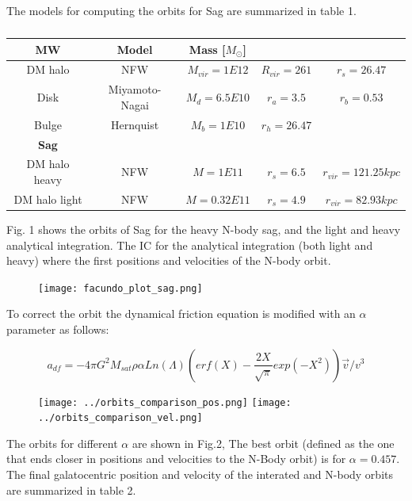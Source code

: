 \label{sec:intro}

The models for computing the orbits for Sag are summarized in table 1.

\begin{table}[H]
\begin{center}
\begin{tabular}{c c c c c}
\hline
\textbf{MW} & Model & Mass [$M_{\odot}$] &  & \\
\hline
DM halo & NFW & $M_{vir} = 1E12$ &$R_{vir} = 261$ &  $r_s = 26.47$ \\
Disk & Miyamoto-Nagai &  $M_d = 6.5E10$ & $r_a = 3.5$ &  $r_b=0.53$  \\
Bulge & Hernquist &  $M_b = 1E10$  & $r_{h} = 26.47 $ &   \\
\hline
\textbf{Sag} & & & &  \\
\hline
DM halo heavy& NFW & $M = 1E11 $ & $r_s=6.5$ & $r_{vir} = 121.25 kpc$ \\
DM halo light & NFW & $M=0.32E11 $ & $r_s = 4.9$ & $r_{vir} = 82.93 kpc$ \\
\hline
\end{tabular}
\end{center}
\caption{}
\end{table}

Fig. 1 shows the orbits of Sag for the heavy N-body sag, and the light 
and heavy analytical integration. The IC for the analytical integration
(both light and heavy) where the first positions and velocities of 
the N-body orbit.  

\begin{figure}[H]
\centering
\texttt{[image: facundo\_plot\_sag.png]}
\caption{}
\end{figure}


To correct the orbit the dynamical friction equation is modified 
with an $\alpha$ parameter as follows:

\begin{equation}
a_{df} = -4\pi G^2 M_{sat} \rho \alpha Ln(\Lambda)  \left( erf(X) - \dfrac{2X}{\sqrt{\pi}}exp(-X^2)   \right) \vec{v}/v^3
\end{equation}

\begin{figure}[H]
\centering
\texttt{[image: ../orbits\_comparison\_pos.png]}
\texttt{[image: ../orbits\_comparison\_vel.png]}
\caption{}
\end{figure}

The orbits for different $\alpha$ are shown in Fig.2, The best orbit (defined as the one
that ends closer in positions and velocities to the N-Body orbit) is for $\alpha=0.457$.
The final galatocentric position and velocity of the interated and N-body orbits 
are summarized in table 2.

